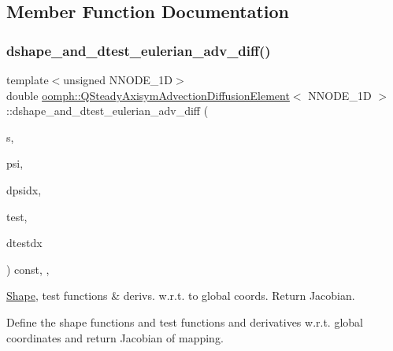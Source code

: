 \subsection{Member Function Documentation}
\mbox{\label{classoomph_1_1QSteadyAxisymAdvectionDiffusionElement_a489c77885741e624d87abe60a82483f3}} 
\subsubsection{\texorpdfstring{dshape\+\_\+and\+\_\+dtest\+\_\+eulerian\+\_\+adv\+\_\+diff()}{dshape\_and\_dtest\_eulerian\_adv\_diff()}}
{\footnotesize\ttfamily template$<$unsigned N\+N\+O\+D\+E\+\_\+1D$>$ \\
double \hyperlink{classoomph_1_1QSteadyAxisymAdvectionDiffusionElement}{oomph\+::\+Q\+Steady\+Axisym\+Advection\+Diffusion\+Element}$<$ N\+N\+O\+D\+E\+\_\+1D $>$\+::dshape\+\_\+and\+\_\+dtest\+\_\+eulerian\+\_\+adv\+\_\+diff (\begin{DoxyParamCaption}\item[{const \hyperlink{classoomph_1_1Vector}{Vector}$<$ double $>$ \&}]{s,  }\item[{\hyperlink{classoomph_1_1Shape}{Shape} \&}]{psi,  }\item[{\hyperlink{classoomph_1_1DShape}{D\+Shape} \&}]{dpsidx,  }\item[{\hyperlink{classoomph_1_1Shape}{Shape} \&}]{test,  }\item[{\hyperlink{classoomph_1_1DShape}{D\+Shape} \&}]{dtestdx }\end{DoxyParamCaption}) const\hspace{0.3cm}{\ttfamily [inline]}, {\ttfamily [protected]}, {\ttfamily [virtual]}}



\hyperlink{classoomph_1_1Shape}{Shape}, test functions \& derivs. w.\+r.\+t. to global coords. Return Jacobian. 

Define the shape functions and test functions and derivatives w.\+r.\+t. global coordinates and return Jacobian of mapping.

